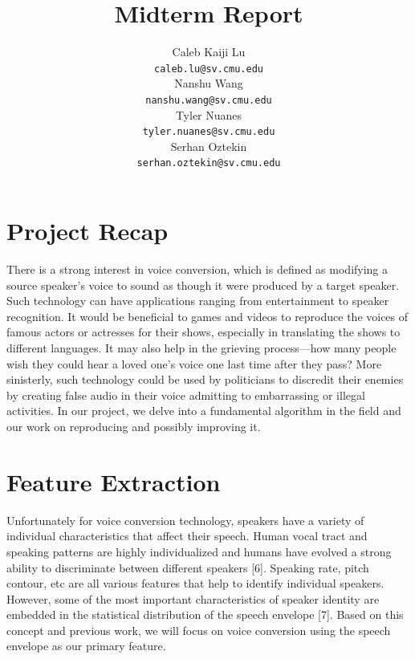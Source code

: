 \documentclass{article}
\title{Midterm Report}
\author{
  Caleb Kaiji Lu\\
  \texttt{caleb.lu@sv.cmu.edu} \\
  \And
  Nanshu Wang\\
  \texttt{nanshu.wang@sv.cmu.edu} \\
   \And
  Tyler Nuanes\\
  \texttt{tyler.nuanes@sv.cmu.edu} \\
  \And
   Serhan Oztekin\\
  \texttt{serhan.oztekin@sv.cmu.edu} \\
}
\begin{document}

\maketitle



\section{Project Recap}

There is a strong interest in voice conversion, which is defined as modifying a source speaker's voice to sound as though it were produced by a target speaker. Such technology can have applications ranging from entertainment to speaker recognition. It would be beneficial to games and videos to reproduce the voices of famous actors or actresses for their shows, especially in translating the shows to different languages. It may also help in the grieving process---how many people wish they could hear a loved one's voice one last time after they pass? More sinisterly, such technology could be used by politicians to discredit their enemies by creating false audio in their voice admitting to embarrassing or illegal activities. In our project, we delve into a fundamental algorithm in the field and our work on reproducing and possibly improving it.

\section{Feature Extraction}
Unfortunately for voice conversion technology, speakers have a variety of individual characteristics that affect their speech. Human vocal tract and speaking patterns are highly individualized and humans have evolved a strong ability to discriminate between different speakers [6].  Speaking rate, pitch contour, etc are all various features that help to identify individual speakers. However, some of the most important characteristics of speaker identity are embedded in the statistical distribution of the speech envelope [7]. Based on this concept and previous work, we will focus on voice conversion using the speech envelope as our primary feature.
 
\end{document}

